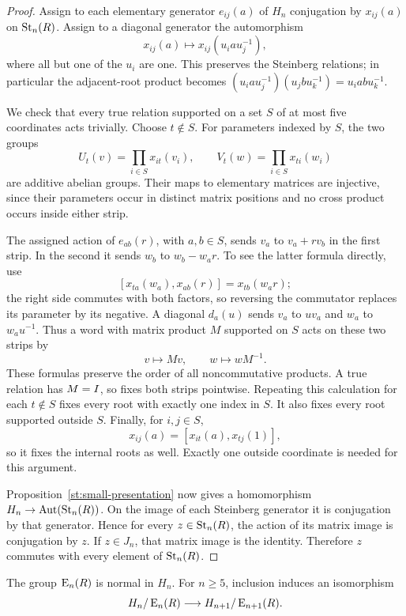 \begin{proof}
Assign to each elementary generator $e_{ij}(a)$ of $H_n$ conjugation
by $x_{ij}(a)$ on $\operatorname{St}_n(R)$. Assign to a diagonal generator the
automorphism
\[
 x_{ij}(a)\longmapsto x_{ij}(u_i a u_j^{-1}),
\]
where all but one of the $u_i$ are one. This preserves the Steinberg
relations; in particular the adjacent-root product becomes
$(u_i a u_j^{-1})(u_j b u_k^{-1})=u_i ab u_k^{-1}$.

We check that every true relation supported on a set $S$ of at most
five coordinates acts trivially. Choose $t\notin S$. For parameters
indexed by $S$, the two groups
\[
 U_t(v)=\prod_{i\in S}x_{it}(v_i),\qquad
 V_t(w)=\prod_{i\in S}x_{ti}(w_i)
\]
are additive abelian groups. Their maps to elementary matrices are
injective, since their parameters occur in distinct matrix positions
and no cross product occurs inside either strip.

The assigned action of $e_{ab}(r)$, with $a,b\in S$, sends
$v_a$ to $v_a+r v_b$ in the first strip. In the second it sends
$w_b$ to $w_b-w_a r$. To see the latter formula directly, use
\[
 [x_{ta}(w_a),x_{ab}(r)]=x_{tb}(w_a r);
\]
the right side commutes with both factors, so reversing the
commutator replaces its parameter by its negative. A diagonal
$d_a(u)$ sends $v_a$ to $u v_a$ and $w_a$ to $w_a u^{-1}$.
Thus a word with matrix product $M$ supported on $S$ acts on these
two strips by
\[
 v\longmapsto Mv,\qquad w\longmapsto wM^{-1}.
\]
These formulas preserve the order of all noncommutative products.
A true relation has $M=I$, so fixes both strips pointwise.
Repeating this calculation for each $t\notin S$ fixes every root
with exactly one index in $S$. It also fixes every root supported
outside $S$. Finally, for $i,j\in S$,
\[
 x_{ij}(a)=[x_{it}(a),x_{tj}(1)],
\]
so it fixes the internal roots as well. Exactly one outside coordinate
is needed for this argument.

Proposition~\ref{st:small-presentation} now gives a homomorphism
$H_n\to\operatorname{Aut}(\operatorname{St}_n(R))$. On the image of each
Steinberg generator it is conjugation by that generator. Hence for
every $z\in\operatorname{St}_n(R)$, the action of its matrix image is conjugation
by $z$. If $z\in J_n$, that matrix image is the identity. Therefore
$z$ commutes with every element of $\operatorname{St}_n(R)$.
\end{proof}

\begin{lemma}\label{st:quotient}
The group $\operatorname{E}_n(R)$ is normal in $H_n$. For $n\geq5$, inclusion
induces an isomorphism
\[
 H_n/\operatorname{E}_n(R)\longrightarrow H_{n+1}/\operatorname{E}_{n+1}(R).
\]
\end{lemma}

